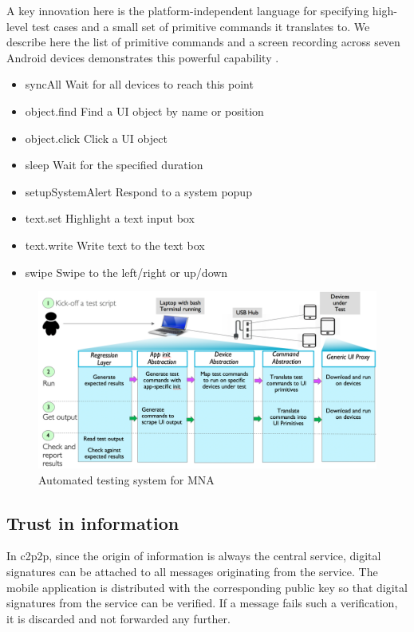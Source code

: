 \documentclass[conference]{IEEEtran}
\begin{document}
A key innovation here is the platform-independent language for
specifying high-level test cases and a small set of primitive commands
it translates to. We describe here the list of primitive commands and
a screen recording across seven Android devices demonstrates this
powerful capability \cite{mna-test-demo}.
\begin{itemize}
\item \textsf{syncAll} Wait for all devices to reach this point
\item \textsf{object.find} Find a UI object by name or position
\item \textsf{object.click} Click a UI object
\item \textsf{sleep} Wait for the specified duration
\item \textsf{setupSystemAlert} Respond to a system popup
\item \textsf{text.set} Highlight a text input box
\item \textsf{text.write} Write text to the text box
\item \textsf{swipe} Swipe to the left/right or up/down
\end{itemize}

\begin{figure}[htbp]
\centerline{\includegraphics[width=\columnwidth]{figs/test_arch}}
\caption{Automated testing system for MNA}
\label{fig:test_arch}
\end{figure}

%
\subsection{Trust in information}
\label{sec:trust}
%
In c2p2p, since the origin of information is always the central
service, digital signatures can be attached to all messages
originating from the service. The mobile application is distributed
with the corresponding public key so that digital signatures from the
service can be verified.  If a message fails such a verification, it
is discarded and not forwarded any further. 
\end{document}
